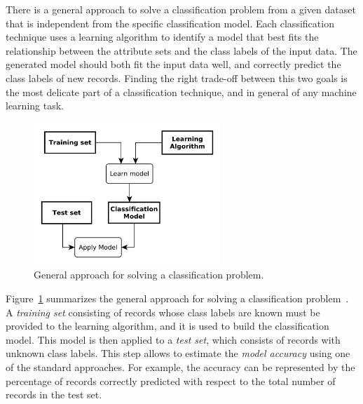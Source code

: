 \documentclass{llncs}
\begin{document}
There is a general approach to solve a classification problem from a given dataset that is independent from the specific classification model. Each classification technique uses a learning algorithm to identify a model that best fits the relationship between the attribute sets and the class labels of the input data. The generated model should both fit the input data well, and correctly predict the class labels of new records. Finding the right trade-off between this two goals is the most delicate part of a classification technique, and in general of any machine learning task.



\begin{figure}[h]
\centering
\includegraphics[width=200pt]
{./items/classifApproach.pdf}
\caption{General approach for solving a classification problem.}
\label{figclassApproach}
\end{figure}


Figure~\ref{figclassApproach} summarizes the general approach for
solving a classification problem~\cite{tan2005introduction}. A \emph{training set}
consisting of records whose class labels are known must be provided to
the learning algorithm, and it is used to build the classification
model. This model is then applied to a \emph{test set}, which consists
of records with unknown class labels.
This step allows to  estimate the \emph{model accuracy} using one of
the standard approaches. For example, the accuracy can be represented by the
percentage 
of records correctly predicted 
with respect to the total number of records in the test set.
\end{document}
